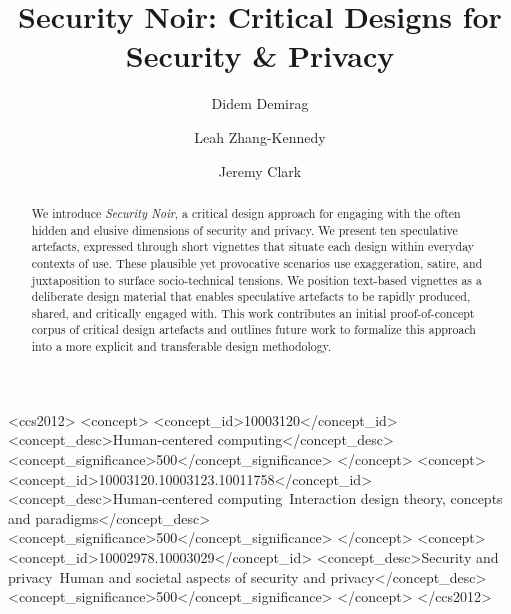 \documentclass[sigconf]{acmart}
\begin{document}
\title{Security Noir: Critical Designs for Security \& Privacy}

\author{Didem Demirag}


\author{Leah Zhang-Kennedy}

\author{Jeremy Clark}

\begin{abstract}

We introduce \textit{Security Noir}, a critical design approach for engaging with the often hidden and elusive dimensions of security and privacy. We present ten speculative artefacts, expressed through short vignettes that situate each design within everyday contexts of use. These plausible yet provocative scenarios use exaggeration, satire, and juxtaposition to surface socio-technical tensions. We position text-based vignettes as a deliberate design material that enables speculative artefacts to be rapidly produced, shared, and critically engaged with. This work contributes an initial proof-of-concept corpus of critical design artefacts and outlines future work to formalize this approach into a more explicit and transferable design methodology.


\end{abstract}

\begin{CCSXML}
<ccs2012>
   <concept>
       <concept_id>10003120</concept_id>
       <concept_desc>Human-centered computing</concept_desc>
       <concept_significance>500</concept_significance>
       </concept>
   <concept>
       <concept_id>10003120.10003123.10011758</concept_id>
       <concept_desc>Human-centered computing~Interaction design theory, concepts and paradigms</concept_desc>
       <concept_significance>500</concept_significance>
       </concept>
   <concept>
       <concept_id>10002978.10003029</concept_id>
       <concept_desc>Security and privacy~Human and societal aspects of security and privacy</concept_desc>
       <concept_significance>500</concept_significance>
       </concept>
 </ccs2012>
\end{CCSXML}
\end{document}
